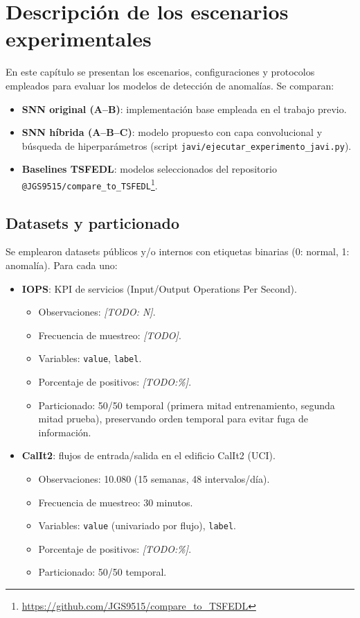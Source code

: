 \section{Descripción de los escenarios experimentales}

En este capítulo se presentan los escenarios, configuraciones y protocolos empleados para evaluar los modelos de detección de anomalías. Se comparan:
\begin{itemize}
    \item \textbf{SNN original (A--B)}: implementación base empleada en el trabajo previo.
    \item \textbf{SNN híbrida (A--B--C)}: modelo propuesto con capa convolucional y búsqueda de hiperparámetros (script \texttt{javi/ejecutar\_experimento\_javi.py}).
    \item \textbf{Baselines TSFEDL}: modelos seleccionados del repositorio \texttt{@JGS9515/compare\_to\_TSFEDL}\footnote{\url{https://github.com/JGS9515/compare_to_TSFEDL}}.
\end{itemize}

\subsection{Datasets y particionado}
Se emplearon datasets públicos y/o internos con etiquetas binarias (0: normal, 1: anomalía). Para cada uno:
\begin{itemize}
    \item \textbf{IOPS}: KPI de servicios (Input/Output Operations Per Second). 
    \begin{itemize}
        \item Observaciones: \textit{[TODO: N]}.
        \item Frecuencia de muestreo: \textit{[TODO]}.
        \item Variables: \texttt{value}, \texttt{label}.
        \item Porcentaje de positivos: \textit{[TODO:\%]}.
        \item Particionado: 50/50 temporal (primera mitad entrenamiento, segunda mitad prueba), preservando orden temporal para evitar fuga de información.
    \end{itemize}
    \item \textbf{CalIt2}: flujos de entrada/salida en el edificio CalIt2 (UCI).
    \begin{itemize}
        \item Observaciones: 10.080 (15 semanas, 48 intervalos/día).
        \item Frecuencia de muestreo: 30 minutos.
        \item Variables: \texttt{value} (univariado por flujo), \texttt{label}.
        \item Porcentaje de positivos: \textit{[TODO:\%]}.
        \item Particionado: 50/50 temporal. 
    \end{itemize}
\end{itemize}

